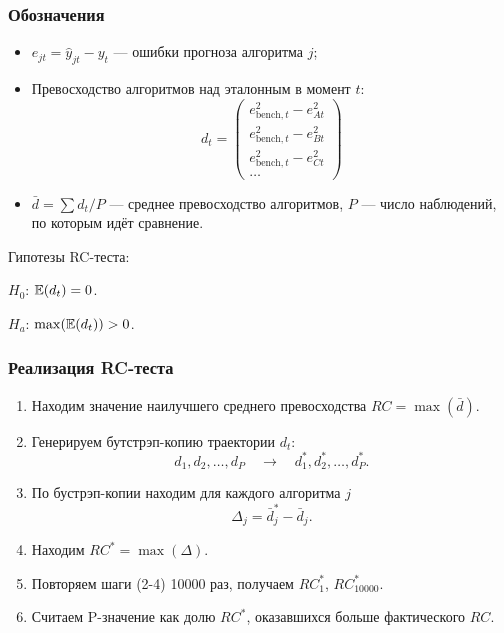 \begin{frame}
    \frametitle{Обозначения}
    
    \begin{itemize}
        \item $e_{jt} = \hat y_{jt} - y_t$ — ошибки прогноза алгоритма $j$; \pause
        \item Превосходство алгоритмов над эталонным в момент $t$:
        \[
        d_t = \begin{pmatrix}
          e_{\text{bench}, t}^2 - e_{At}^2 \\
          e_{\text{bench}, t}^2 - e_{Bt}^2 \\          
          e_{\text{bench}, t}^2 - e_{Ct}^2 \\
          \ldots
        \end{pmatrix}  
        \] \pause
        \item $\bar d = \sum d_t / P$ —  среднее превосходство алгоритмов, $P$ — число наблюдений, по которым идёт сравнение.  
    \end{itemize}    
    \pause 
    Гипотезы RC-теста:
    
    $H_0$: $\mathbb{E}(d_t) = 0$. 

    $H_a$: $\max(\mathbb{E}(d_t)) > 0$.
\end{frame}




\begin{frame}
    \frametitle{Реализация RC-теста}

    \begin{enumerate}[<+->]
        \item Находим значение наилучшего среднего превосходства $RC = \max (\bar d)$.  
        \item Генерируем \alert{бутстрэп-копию} траектории $d_t$: 
        \[
        d_1, d_2, \ldots, d_P  \quad \to \quad     d_1^*, d_2^*, \ldots, d_P^*.
        \]
        \item По бустрэп-копии находим для каждого алгоритма $j$
        \[
            \Delta_j = \bar d^*_j - \bar d_j.
        \]
        \item Находим $RC^* = \max(\Delta)$.
        \item Повторяем шаги (2-4) 10000 раз, получаем $RC^*_1$, $RC^*_{10000}$.
        \item Считаем P-значение как долю $RC^*$, оказавшихся больше фактического $RC$.
    \end{enumerate}
\end{frame}

